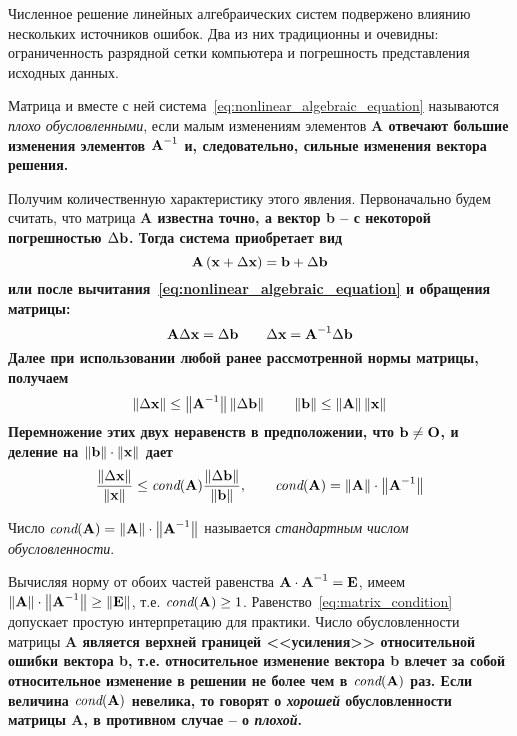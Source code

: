 Численное решение линейных алгебраических систем подвержено влиянию нескольких источников ошибок. Два из них традиционны
и очевидны: ограниченность разрядной сетки компьютера и погрешность представления исходных данных.
\begin{definition}
    Матрица и вместе с ней система~\eqref{eq:nonlinear_algebraic_equation} называются \emph{плохо обусловленными}, если
    малым изменениям элементов \bf{A} отвечают большие изменения элементов $\bf{A}^{-1}$ и, следовательно, сильные
    изменения вектора решения.
\end{definition}
Получим количественную характеристику этого явления. Первоначально будем считать, что матрица \bf{A} известна точно, а
вектор \bf{b} -- с некоторой погрешностью $\Delta \bf{b}$. Тогда система приобретает вид
\begin{equation*}
    \bf{A}\left( \bf{x} + \Delta \bf{x} \right) = \bf{b} + \Delta \bf{b}
\end{equation*}
или после вычитания~\eqref{eq:nonlinear_algebraic_equation} и обращения матрицы:
\begin{equation*}
    \bf{A}\Delta\bf{x} = \Delta \bf{b} \qquad \Delta \bf{x} = \bf{A}^{-1}\Delta \bf{b}
\end{equation*}
Далее при использовании любой ранее рассмотренной нормы матрицы, получаем
\begin{equation*}
    \left\| \Delta \bf{x} \right\| \leq \left\| \bf{A}^{-1} \right\| \left\| \Delta \bf{b} \right\| \qquad \left\| \bf{b} \right\| \leq \left\| \bf{A} \right\| \left\| \bf{x} \right\|
\end{equation*}
Перемножение этих двух неравенств в предположении, что $\bf{b} \neq \bf{O}$, и деление на $\left\| \bf{b} \right\| \cdot \left\| \bf{x} \right\|$ дает
\begin{equation}
    \frac{\left\| \Delta \bf{x} \right\|}{\left\| \bf{x} \right\|} \leq \textit{cond}(\bf{A})\frac{\left\| \Delta \bf{b} \right\|}{\left\| \bf{b} \right\|},
    \qquad \textit{cond}(\bf{A}) = \left\| \bf{A} \right\| \cdot \left\| \bf{A}^{-1} \right\| \label{eq:matrix_condition}
\end{equation}
\begin{definition}
    Число $\displaystyle \textit{cond}(\bf{A}) = \left\| \bf{A} \right\| \cdot \left\| \bf{A}^{-1} \right\|$ называется
    \emph{стандартным числом обусловленности}.
\end{definition}
Вычисляя норму от обоих частей равенства $\displaystyle \bf{A} \cdot \bf{A}^{-1} = \bf{E}$, имеем
$\displaystyle \left\| \bf{A} \right\| \cdot \left\| \bf{A}^{-1} \right\| \geq \left\| \bf{E} \right\|$, т.е.
$\textit{cond}(\bf{A}) \geq 1$. Равенство~\eqref{eq:matrix_condition} допускает простую интерпретацию для практики. Число
обусловленности матрицы \bf{A} является верхней границей <<усиления>> относительной ошибки вектора \bf{b}, т.е.
относительное изменение вектора \bf{b} влечет за собой относительное изменение в решении не более чем в
$\textit{cond}(\bf{A})$ раз. Если величина $\textit{cond}(\bf{A})$ невелика, то говорят о \emph{хорошей} обусловленности
матрицы \bf{A}, в противном случае -- о \emph{плохой}.
\vspace{5pt}

